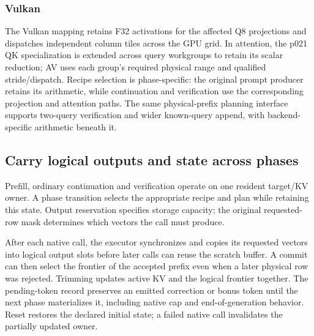 \subsubsection{Vulkan}
The Vulkan mapping retains F32 activations for the affected Q8 projections and dispatches independent column tiles across the GPU grid. In attention, the p021 QK specialization is extended across query workgroups to retain its scalar reduction; AV uses each group's required physical range and qualified stride/dispatch. Recipe selection is phase-specific: the original prompt producer retains its arithmetic, while continuation and verification use the corresponding projection and attention paths. The same physical-prefix planning interface supports two-query verification and wider known-query append, with backend-specific arithmetic beneath it.

\subsection{Carry logical outputs and state across phases}
Prefill, ordinary continuation and verification operate on one resident target/KV owner. A phase transition selects the appropriate recipe and plan while retaining this state. Output reservation specifies storage capacity; the original requested-row mask determines which vectors the call must produce.

After each native call, the executor synchronizes and copies its requested vectors into logical output slots before later calls can reuse the scratch buffer. A commit can then select the frontier of the accepted prefix even when a later physical row was rejected. Trimming updates active KV and the logical frontier together. The pending-token record preserves an emitted correction or bonus token until the next phase materializes it, including native cap and end-of-generation behavior. Reset restores the declared initial state; a failed native call invalidates the partially updated owner.

